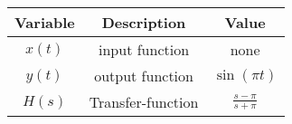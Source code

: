 \begin{tabular}{|c|c|c|} 
    \hline
    \textbf{Variable} & \textbf{Description} & \textbf{Value} \\
    \hline
    $x(t)$ & input function & none \\
    \hline
    $y(t)$ & output function & $\sin(\pi t)$ \\
    \hline
    $H(s)$ & Transfer-function & $\frac{s-\pi}{s+\pi}$ \\
    \hline
\end{tabular}
